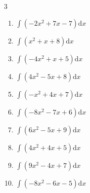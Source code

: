 \begin{multicols}{3}
\begin{enumerate}

\columnbreak %

\resetques

  \item $\displaystyle \int \left( -2x^{2}+7x-7 \right) \mathrm{d}x$


  \item $\displaystyle \int \left( x^{2}+x+8 \right) \mathrm{d}x$


  \item $\displaystyle \int \left( -4x^{2}+x+5 \right) \mathrm{d}x$


  \item $\displaystyle \int \left( 4x^{2}-5x+8 \right) \mathrm{d}x$


  \item $\displaystyle \int \left( -x^{2}+4x+7 \right) \mathrm{d}x$


  \item $\displaystyle \int \left( -8x^{2}-7x+6 \right) \mathrm{d}x$


  \item $\displaystyle \int \left( 6x^{2}-5x+9 \right) \mathrm{d}x$


  \item $\displaystyle \int \left( 4x^{2}+4x+5 \right) \mathrm{d}x$


  \item $\displaystyle \int \left( 9x^{2}-4x+7 \right) \mathrm{d}x$


  \item $\displaystyle \int \left( -8x^{2}-6x-5 \right) \mathrm{d}x$


\end{enumerate}
\end{multicols}
